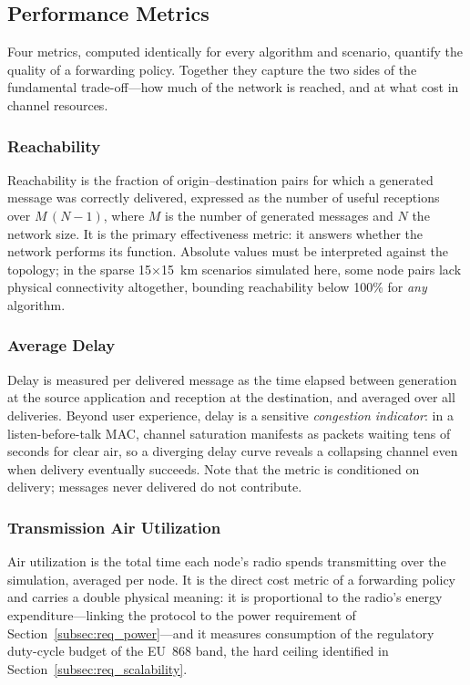 \documentclass[english,bachelor]{tfgitic}[2026/01/22]
\begin{document}
\subsection{Performance Metrics}
\label{sec:sim_metrics}
 
Four metrics, computed identically for every algorithm and scenario, quantify the quality of a forwarding policy. Together they capture the two sides of the fundamental trade-off---how much of the network is reached, and at what cost in channel resources.
 
\subsubsection{Reachability}
 
Reachability is the fraction of origin--destination pairs for which a generated message was correctly delivered, expressed as the number of useful receptions over $M\,(N-1)$, where $M$ is the number of generated messages and $N$ the network size. It is the primary effectiveness metric: it answers whether the network performs its function. Absolute values must be interpreted against the topology; in the sparse 15$\times$15~km scenarios simulated here, some node pairs lack physical connectivity altogether, bounding reachability below 100\% for \emph{any} algorithm.
 
\subsubsection{Average Delay}
 
Delay is measured per delivered message as the time elapsed between generation at the source application and reception at the destination, and averaged over all deliveries. Beyond user experience, delay is a sensitive \emph{congestion indicator}: in a listen-before-talk MAC, channel saturation manifests as packets waiting tens of seconds for clear air, so a diverging delay curve reveals a collapsing channel even when delivery eventually succeeds. Note that the metric is conditioned on delivery; messages never delivered do not contribute.
 
\subsubsection{Transmission Air Utilization}
 
Air utilization is the total time each node's radio spends transmitting over the simulation, averaged per node. It is the direct cost metric of a forwarding policy and carries a double physical meaning: it is proportional to the radio's energy expenditure---linking the protocol to the power requirement of Section~\ref{subsec:req_power}---and it measures consumption of the regulatory duty-cycle budget of the EU~868 band, the hard ceiling identified in Section~\ref{subsec:req_scalability}.
 
\end{document}
